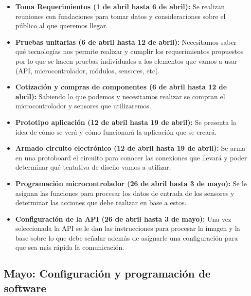 \documentclass{article}
\begin{document}
\begin{itemize}
    \item\textbf{Toma Requerimientos (1 de abril hasta 6 de abril):} Se realizan reuniones con fundaciones para tomar datos y consideraciones sobre el público al que queremos llegar.
    
    \item\textbf{Pruebas unitarias (6 de abril hasta 12 de abril):} Necesitamos saber qué tecnologías nos permite realizar y cumplir los requerimientos propuestos por lo que se hacen pruebas individuales a los elementos que vamos a usar (API, microcontrolador, módulos, sensores, etc).
    
    \item\textbf{Cotización y compras de componentes (6 de abril hasta 12 de abril):} Sabiendo lo que podemos y necesitamos realizar se compran el microcontrolador y sensores que utilizaremos.
    
    \item\textbf{Prototipo aplicación (12 de abril hasta 19 de abril):} Se presenta la idea de cómo se verá y cómo funcionará la aplicación que se creará.
    
    \item\textbf{Armado circuito electrónico (12 de abril hasta 19 de abril):} Se arma en una protoboard el circuito para conocer las conexiones que llevará y poder determinar qué tentativa de diseño vamos a utilizar.
    
    \item\textbf{Programación microcontrolador (26 de abril hasta 3 de mayo):} Se le asignan las funciones para procesar los datos de entrada de los sensores y determinar las acciones que debe realizar en base a estos.
    
    \item \textbf{Configuración de la API (26 de abril hasta 3 de mayo):} Una vez seleccionada la API se le dan las instrucciones para procesar la imagen y la base sobre lo que debe señalar además de asignarle una configuración para que sea más rápida la comunicación.
\end{itemize}

\subsection*{Mayo: Configuración y programación de software}
\end{document}
